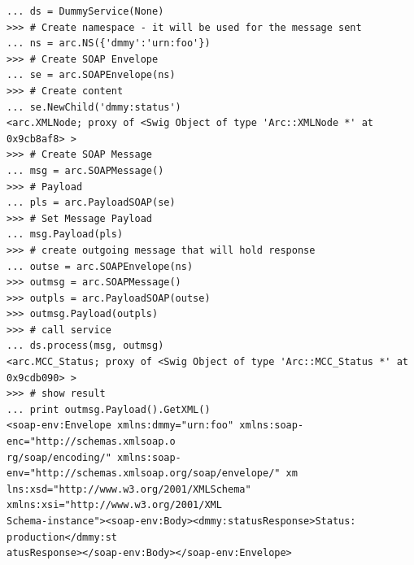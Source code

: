\documentclass{article}
\begin{document}
\begin{flushleft}
\begin{itemize}
{\begin{example}
\begin{verbatim}
... ds = DummyService(None)
>>> # Create namespace - it will be used for the message sent
... ns = arc.NS({'dmmy':'urn:foo'})
>>> # Create SOAP Envelope
... se = arc.SOAPEnvelope(ns)
>>> # Create content
... se.NewChild('dmmy:status')
<arc.XMLNode; proxy of <Swig Object of type 'Arc::XMLNode *' at 0x9cb8af8> >
>>> # Create SOAP Message
... msg = arc.SOAPMessage()
>>> # Payload
... pls = arc.PayloadSOAP(se)
>>> # Set Message Payload
... msg.Payload(pls)
>>> # create outgoing message that will hold response
... outse = arc.SOAPEnvelope(ns)
>>> outmsg = arc.SOAPMessage()
>>> outpls = arc.PayloadSOAP(outse)
>>> outmsg.Payload(outpls)
>>> # call service
... ds.process(msg, outmsg)
<arc.MCC_Status; proxy of <Swig Object of type 'Arc::MCC_Status *' at 0x9cdb090> >
>>> # show result
... print outmsg.Payload().GetXML()
<soap-env:Envelope xmlns:dmmy="urn:foo" xmlns:soap-enc="http://schemas.xmlsoap.o
rg/soap/encoding/" xmlns:soap-env="http://schemas.xmlsoap.org/soap/envelope/" xm
lns:xsd="http://www.w3.org/2001/XMLSchema" xmlns:xsi="http://www.w3.org/2001/XML
Schema-instance"><soap-env:Body><dmmy:statusResponse>Status: production</dmmy:st
atusResponse></soap-env:Body></soap-env:Envelope>
\end{verbatim}
    \end{example}
  }
\end{itemize}


\end{flushleft}
\end{document}
